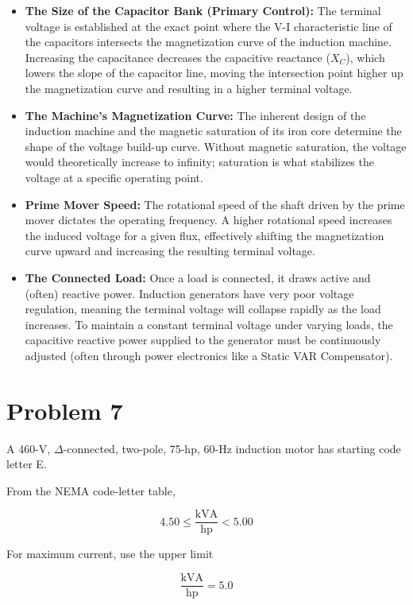 \documentclass[12pt]{article}
\begin{document}
\begin{itemize}
	\item \textbf{The Size of the Capacitor Bank (Primary Control):} 
	The terminal voltage is established at the exact point where the V-I characteristic line of the capacitors intersects the magnetization curve of the induction machine. Increasing the capacitance decreases the capacitive reactance ($X_C$), which lowers the slope of the capacitor line, moving the intersection point higher up the magnetization curve and resulting in a higher terminal voltage.
	
	\item \textbf{The Machine's Magnetization Curve:} 
	The inherent design of the induction machine and the magnetic saturation of its iron core determine the shape of the voltage build-up curve. Without magnetic saturation, the voltage would theoretically increase to infinity; saturation is what stabilizes the voltage at a specific operating point.
	
	\item \textbf{Prime Mover Speed:} 
	The rotational speed of the shaft driven by the prime mover dictates the operating frequency. A higher rotational speed increases the induced voltage for a given flux, effectively shifting the magnetization curve upward and increasing the resulting terminal voltage.
	
	\item \textbf{The Connected Load:} 
	Once a load is connected, it draws active and (often) reactive power. Induction generators have very poor voltage regulation, meaning the terminal voltage will collapse rapidly as the load increases. To maintain a constant terminal voltage under varying loads, the capacitive reactive power supplied to the generator must be continuously adjusted (often through power electronics like a Static VAR Compensator).
\end{itemize}
\newpage
\section*{Problem 7}

A 460-V, $\Delta$-connected, two-pole, 75-hp, 60-Hz induction motor has
starting code letter E.

From the NEMA code-letter table,

\[
4.50 \le \frac{\text{kVA}}{\text{hp}} < 5.00
\]

For maximum current, use the upper limit

\[
\frac{\text{kVA}}{\text{hp}} = 5.0
\]
\end{document}
